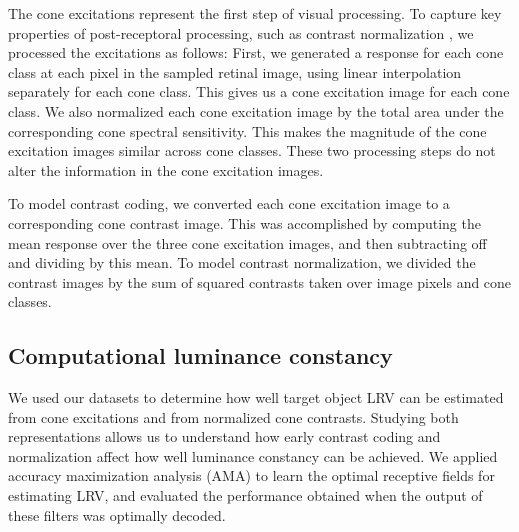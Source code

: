 \documentclass{jov}
\begin{document}
The cone excitations represent the first step of visual processing.
To capture key properties of post-receptoral processing, such as contrast normalization \cite{heeger1992normalization,albrecht1991motion,carandini2012normalization},
we processed the excitations as follows:
First, we generated a response for each cone class at each pixel in the sampled retinal image, using linear interpolation separately for each cone class.
This gives us a cone excitation image for each cone class.
We also normalized each cone excitation image by the total area under the corresponding cone spectral sensitivity.
This makes the magnitude of the cone excitation images similar across cone classes.
These two processing steps do not alter the information in the cone excitation images. 

To model contrast coding, we converted each cone excitation image to a corresponding cone contrast image.
This was accomplished by computing the mean response over the three cone excitation images, and then subtracting off and dividing by this mean.
To model contrast normalization, we divided the contrast images by the sum of squared contrasts taken over image pixels and cone classes.


\subsection{Computational luminance constancy} \label{method:SupervisedLearning}
We used our datasets to determine how well target object LRV can be estimated from cone excitations and from normalized cone contrasts.
Studying both representations allows us to understand how early contrast coding and normalization affect how well luminance constancy can be achieved.
We applied accuracy maximization analysis (AMA) to learn the optimal receptive fields for estimating LRV,
and evaluated the performance obtained when the output of these filters was optimally decoded.
\end{document}
